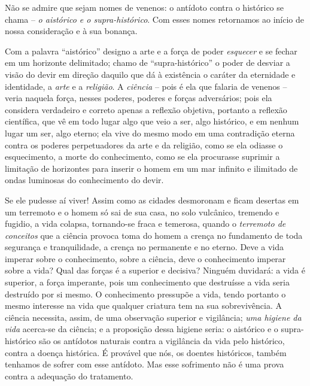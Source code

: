     Não se admire que sejam nomes de venenos: o antídoto contra o
    histórico se chama -- \emph{o aistórico e o supra-histórico}. Com
    esses nomes retornamos ao início de nossa consideração e à sua
    bonança.

    Com a palavra ``aistórico'' designo a arte e a força de poder
    \emph{esquecer} e se fechar em um horizonte delimitado; chamo de
    ``supra-histórico'' o poder de desviar a visão do devir em direção
    daquilo que dá à existência o caráter da eternidade e identidade, a
    \emph{arte} e a \emph{religião}. A \emph{ciência} -- pois é ela que
    falaria de venenos -- veria naquela força, nesses poderes, poderes e
    forças adversários; pois ela considera verdadeiro e correto apenas a
    reflexão objetiva, portanto a reflexão científica, que vê em todo
    lugar algo que veio a ser, algo histórico, e em nenhum lugar um ser,
    algo eterno; ela vive do mesmo modo em uma contradição eterna contra
    os poderes perpetuadores da arte e da religião, como se ela odiasse
    o esquecimento, a morte do conhecimento, como se ela procurasse
    suprimir a limitação de horizontes para inserir o homem em um mar
    infinito e ilimitado de ondas luminosas do conhecimento do devir.

    Se ele pudesse aí viver! Assim como as cidades desmoronam e ficam
    desertas em um terremoto e o homem só sai de sua casa, no solo
    vulcânico, tremendo e fugidio, a vida colapsa, tornando-se fraca e
    temerosa, quando o \emph{terremoto de conceitos} que a ciência
    provoca toma do homem a crença no fundamento de toda segurança e
    tranquilidade, a crença no permanente e no eterno. Deve a vida
    imperar sobre o conhecimento, sobre a ciência, deve o conhecimento
    imperar sobre a vida? Qual das forças é a superior e decisiva?
    Ninguém duvidará: a vida é superior, a força imperante, pois um
    conhecimento que destruísse a vida seria destruído por si mesmo. O
    conhecimento pressupõe a vida, tendo portanto o mesmo interesse na
    vida que qualquer criatura tem na sua sobrevivência. A ciência
    necessita, assim, de uma observação superior e vigilância; \emph{uma
    higiene da vida} acerca-se da ciência; e a proposição dessa higiene
    seria: o aistórico e o supra-histórico são os antídotos naturais
    contra a vigilância da vida pelo histórico, contra a doença
    histórica. É provável que nós, os doentes históricos, também
    tenhamos de sofrer com esse antídoto. Mas esse sofrimento não é uma
    prova contra a adequação do tratamento.

